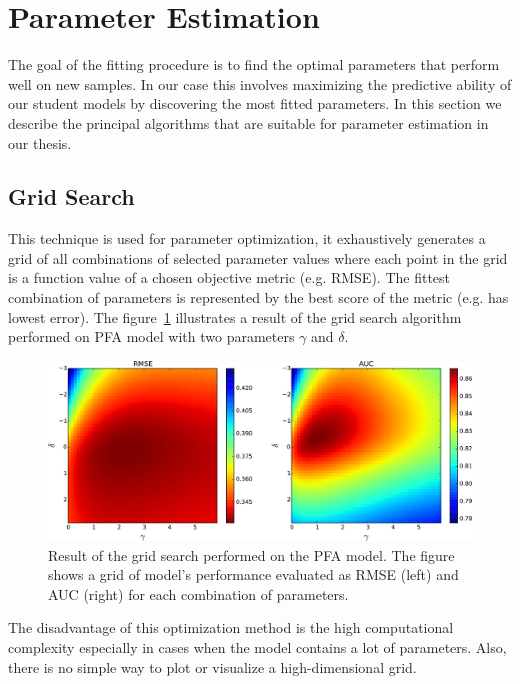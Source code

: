 \section{Parameter Estimation}
\label{parameter-estimation}

The goal of the fitting procedure is to find the optimal parameters that perform well on new samples. In our case this involves maximizing the predictive ability of our student models by discovering the most fitted parameters. In this section we describe the principal algorithms that are suitable for parameter estimation in our thesis.

\subsection{Grid Search}
\label{grid-search}

This technique is used for parameter optimization, it exhaustively generates a grid of all combinations of selected parameter values where each point in the grid is a function value of a chosen objective metric (e.g. RMSE). The fittest combination of parameters is represented by the best score of the metric (e.g. has lowest error). The figure~\ref{fig-grid-search-rmse-auc} illustrates a result of the grid search algorithm performed on PFA model with two parameters $\gamma$ and $\delta$.

\begin{figure}[htbp]
  \centering
  \includegraphics[width=\textwidth]{img/pfa-grid-search-rmse-auc}
  \caption{Result of the grid search performed on the PFA model. The figure shows a grid of model's performance evaluated as RMSE (left) and AUC (right) for each combination of parameters.}
  \label{fig-grid-search-rmse-auc}
\end{figure}

The disadvantage of this optimization method is the high computational complexity especially in cases when the model contains a lot of parameters. Also, there is no simple way to plot or visualize a high-dimensional grid.

